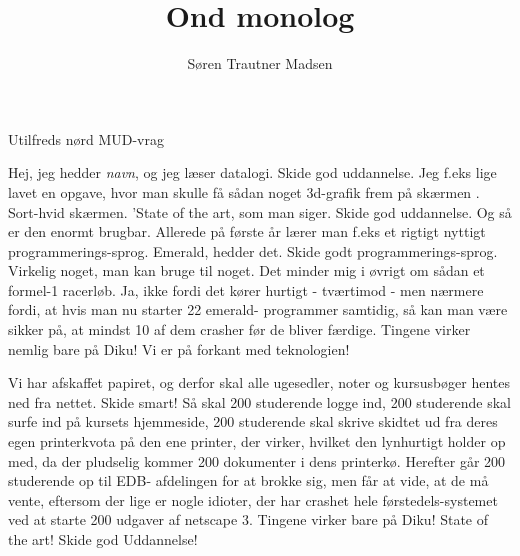 \documentclass[11pt]{article}
\title{Ond monolog}
\author{Søren Trautner Madsen}
\begin{document}
\maketitle

\begin{sketch}

\begin{roles}
 Utilfreds nørd
 MUD-vrag
\end{roles}



Hej, jeg hedder \emph{navn}, og jeg læser datalogi. Skide god uddannelse. Jeg 
f.eks lige lavet en opgave, hvor man skulle få sådan noget 3d-grafik frem på 
skærmen . Sort-hvid skærmen. 'State of the art, som man siger. Skide god 
uddannelse. Og så er den enormt brugbar. Allerede på første år lærer man 
f.eks et rigtigt nyttigt programmerings-sprog. Emerald, hedder det. Skide 
godt programmerings-sprog. Virkelig noget, man kan bruge til noget. Det 
minder mig i øvrigt om sådan et formel-1 racerløb. Ja, ikke fordi det kører 
hurtigt - tværtimod - men nærmere fordi, at hvis man nu starter 22 emerald-
programmer samtidig, så kan man være sikker på, at mindst 10 af dem 
crasher før de bliver færdige. Tingene virker nemlig bare på Diku! Vi er på 
forkant med teknologien! 

Vi har afskaffet papiret, og derfor skal alle ugesedler, noter og kursusbøger 
hentes ned fra nettet. Skide smart! Så skal 200 studerende logge ind, 200 
studerende skal surfe ind på kursets hjemmeside, 200 studerende skal 
skrive skidtet ud fra deres egen printerkvota på den ene printer, der virker, 
hvilket den lynhurtigt holder op med, da der pludselig kommer 200 
dokumenter i dens printerkø. Herefter går 200 studerende op til EDB-
afdelingen for at brokke sig, men får at vide, at de må vente, eftersom der 
lige er nogle idioter, der har crashet hele førstedels-systemet ved at starte 
200 udgaver af netscape 3. Tingene virker bare på Diku! State of the art! 
Skide god Uddannelse!


\end{sketch}
\end{document}
